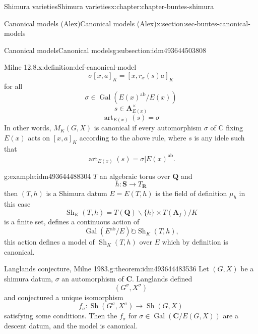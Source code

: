 \documentclass[oneside,10pt,]{book}
\numberwithin{equation}{section}
\newcommand{\lb}{[}
\newcommand{\rb}{]}
\newcommand{\QQ}{\mathbf{Q}}
\newcommand{\RR}{\mathbf{R}}
\newcommand{\CC}{\mathbf{C}}
\newcommand{\adeles}{\mathbf{A}}
\newcommand{\acts}{\circlearrowright}
\newcommand{\ab}{\mathrm{ab}}
\newcommand{\Gal}[2]{\operatorname{Gal}(#1/#2)}
\begin{document}
\begin{chapterptx}{Shimura varieties}{}{Shimura varieties}{}{}{x:chapter:chapter-buntes-shimura}
\begin{sectionptx}{Canonical models (Alex)}{}{Canonical models (Alex)}{}{}{x:section:sec-buntes-canonical-models}
\begin{subsectionptx}{Canonical models}{}{Canonical models}{}{}{g:subsection:idm493644503808}
\begin{definition}{Milne 12.8.}{x:definition:def-canonical-model}
\begin{equation*}
\sigma [x,a]_K = [x, r_x(s) a]_K
\end{equation*}
for all%
\begin{equation*}
\sigma \in \Gal{E(x)^\ab}{E(x)}
\end{equation*}
%
\begin{equation*}
s\in \adeles^\times_{E(x)}
\end{equation*}
%
\begin{equation*}
{\operatorname{art}}_{E(x)}(s) = \sigma
\end{equation*}
In other words, \(M_K(G,X)\) is canonical if every automorphism \(\sigma\) of C fixing \(E(x)\) acts on \(\lb x,a\rb_K\) according to the above rule, where \(s\) is any idele such that%
\begin{equation*}
{\operatorname{art}}_{E(x)}(s) = \sigma| E(x)^{\ab}\text{.}
\end{equation*}
%
\end{definition}
\begin{example}{}{g:example:idm493644488304}%
\(T \) an algebraic torus over \(\QQ\) and%
\begin{equation*}
h \colon \mathbf S \to T_\RR
\end{equation*}
then  \((T,h)\) is a Shimura datum \(E = E(T,h)\) is the field of definition \(\mu_h\) in this case%
\begin{equation*}
{\operatorname{Sh}}_K(T,h) = T(\QQ) \backslash \{h\}  \times T(\adeles_f) / K
\end{equation*}
is a finite set, defines a continuous action of%
\begin{equation*}
\Gal{E^\ab}{E} \acts {\operatorname{Sh}}_K(T,h)\text{,}
\end{equation*}
this action defines a model of \({\operatorname{Sh}}_K(T, h)\) over \(E\) which by definition is canonical.%
\end{example}
\begin{theorem}{Langlands conjecture, Milne 1983.}{}{g:theorem:idm493644483536}%
Let \((G,X)\) be a shimura datum, \(\sigma\) an automorphism of \(\CC\). Langlands defined%
\begin{equation*}
(G^\sigma, X^\sigma)
\end{equation*}
and conjectured a unique isomorphism%
\begin{equation*}
f_\sigma \colon {\operatorname{Sh}}(G^\sigma, X^\sigma) \to {\operatorname{Sh}}(G,X)
\end{equation*}
satisfying some conditions. Then the \(f_\sigma\) for \(\sigma\in \Gal{\CC}{E(G,X)}\) are a descent datum, and the model is canonical.%

\end{theorem}
\end{subsectionptx}
\end{sectionptx}
\end{chapterptx}
\end{document}
